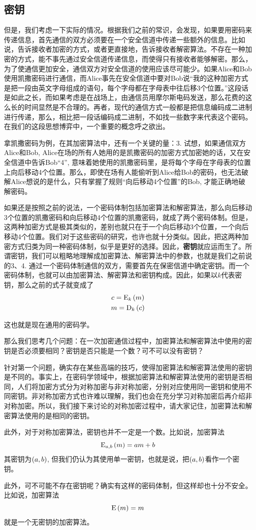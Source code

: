 \subsection{密钥}
但是，我们考虑一下实际的情况。根据我们之前的常识，会发现，如果要用密码来传递信息，首先通信的双方必须要在一个安全信道中传递一些额外的信息。比如说，告诉接收者加密的方式，或者更直接地，告诉接收者解密算法。不存在一种加密的方式，能不事先通过安全信道传递信息，而使得只有接收者能够解密。那么，为了使通信更加安全，通信双方对安全信道的使用应该尽可能少。如果Alice和Bob使用凯撒密码进行通信，而Alice事先在安全信道中要对Bob说“我的这种加密方式是把一段由英文字母组成的语句，每个字母都在字母表中往后移3个位置。”这段话是如此之长，而如果考虑是在战场上，由通信员用摩尔斯电码发送，那么花费的这么长的时间显然是不合理的。再者，现代的通信方式一般都是把信息编码成二进制进行传递，那么，相比把一段话编码成二进制，不如找一些数字来代表这个密码。在我们的这段思想博弈中，一个重要的概念呼之欲出。\par
拿凯撒密码为例，在其加密算法中，还有一个关键的量：3. 试想，如果通信双方Alice和Bob, Alice在场的所有人她用的是凯撒密码的加密方式加密她的话，又在安全信道中告诉Bob``4'', 意味着她使用的凯撒密码里，是将每个字母在字母表的位置上向后移动4个位置。那么，即使在场有人能偷听到Alice给Bob的密码，也无法破解Alice想说的是什么，只有掌握了规则“向后移动4个位置”的Bob, 才能正确地破解密码。\par
如果还是按照之前的说法，一个密码体制包括加密算法和解密算法，那么向后移动3个位置的凯撒密码和向后移动4个位置的凯撒密码，就成了两个密码体制。但是，这两种加密方式是极其类似的，差别也就只在于一个向后移动3个位置，一个向后移动4个位置。我们对于这些密码的研究，也许也就十分类似。因此，把这两种加密方式归类为同一种密码体制，似乎是更好的选择。因此，\textbf{密钥}就应运而生了。所谓密钥，我们可以粗略地理解成加密算法、解密算法中的参数，也就是我们之前说的3、4. 通过一个密码体制通信的双方，需要首先在保密信道中确定密钥。而一个密码体制，也就可以由加密算法、解密算法和密钥构成。因此，如果以$k$代表密钥，那么之前的式子就变成了
\begin{gather*}
    c={\mathrm{E}_{k}\left({m}\right)}\\
    m={\mathrm{D}_{k}\left({c}\right)}
\end{gather*}

这也就是现在通用的密码学。\par
那么我们思考几个问题：在一次加密通信过程中，加密算法和解密算法中使用的密钥是否必须要相同？密钥是否只能是一个数？可不可以没有密钥？\par
针对第一个问题，确实存在某些高端的技巧，使得加密算法和解密算法使用的密钥是不同的。事实上，在密码学领域中，根据加密算法和解密算法使用的密钥是否相同，人们将加密方式分为对称加密与非对称加密，分别对应使用同一密钥和使用不同密钥。非对称加密方式也许难以理解，我们也会在充分学习对称加密后再介绍非对称加密。所以，我们接下来讨论的对称加密过程中，请大家记住，加密算法和解密算法使用的是相同的密钥。\par
此外，对于对称加密算法，密钥也并不一定是一个数。比如说，加密算法
\[{\mathrm{E}_{a, b}\left({m}\right)}=am+b\]
其密钥为$\left( {a, b}\right)$, 但我们仍认为其使用单一密钥，也就是说，把$\left( {a, b}\right)$看作一个密钥。\par
此外，可不可能不存在密钥呢？确实有这样的密码体制，但这样却也十分不安全。比如说，加密算法
\[\mathrm{E}\left( {m}\right)=m\]
就是一个无密钥的加密算法。
